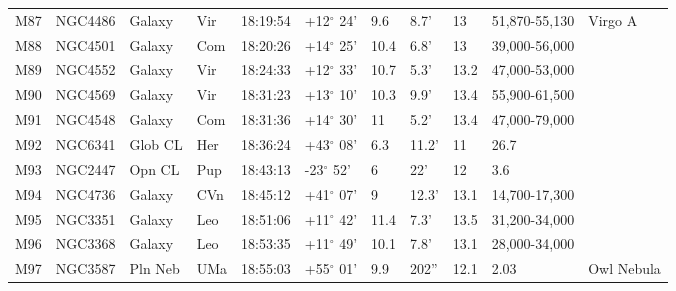 \begin{longtable}{@{}lllllllllll@{}}
M87        & NGC4486     & Galaxy     & Vir       & 18:19:54 & +12$^{\circ}$ 24'  & 9.6       & 8.7'                 & 13       & 51,870-55,130       & Virgo A                                   \\
M88        & NGC4501     & Galaxy     & Com       & 18:20:26 & +14$^{\circ}$ 25'  & 10.4      & 6.8'                 & 13       & 39,000-56,000       &                                           \\
M89        & NGC4552     & Galaxy     & Vir       & 18:24:33 & +12$^{\circ}$ 33'  & 10.7      & 5.3'                 & 13.2     & 47,000-53,000       &                                           \\
M90        & NGC4569     & Galaxy     & Vir       & 18:31:23 & +13$^{\circ}$ 10'  & 10.3      & 9.9'                 & 13.4     & 55,900-61,500       &                                           \\
M91        & NGC4548     & Galaxy     & Com       & 18:31:36 & +14$^{\circ}$ 30'  & 11        & 5.2'                 & 13.4     & 47,000-79,000       &                                           \\
M92        & NGC6341     & Glob CL    & Her       & 18:36:24 & +43$^{\circ}$ 08'  & 6.3       & 11.2'                & 11       & 26.7                &                                           \\
M93        & NGC2447     & Opn CL     & Pup       & 18:43:13 & -23$^{\circ}$ 52'  & 6         & 22'                  & 12       & 3.6                 &                                           \\
M94        & NGC4736     & Galaxy     & CVn       & 18:45:12 & +41$^{\circ}$ 07'  & 9         & 12.3'                & 13.1     & 14,700-17,300       &                                           \\
M95        & NGC3351     & Galaxy     & Leo       & 18:51:06 & +11$^{\circ}$ 42'  & 11.4      & 7.3'                 & 13.5     & 31,200-34,000       &                                           \\
M96        & NGC3368     & Galaxy     & Leo       & 18:53:35 & +11$^{\circ}$ 49'  & 10.1      & 7.8'                 & 13.1     & 28,000-34,000       &                                           \\
M97        & NGC3587     & Pln Neb    & UMa       & 18:55:03 & +55$^{\circ}$ 01'  & 9.9       & 202''                & 12.1     & 2.03                & Owl Nebula                                \\

\end{longtable}
